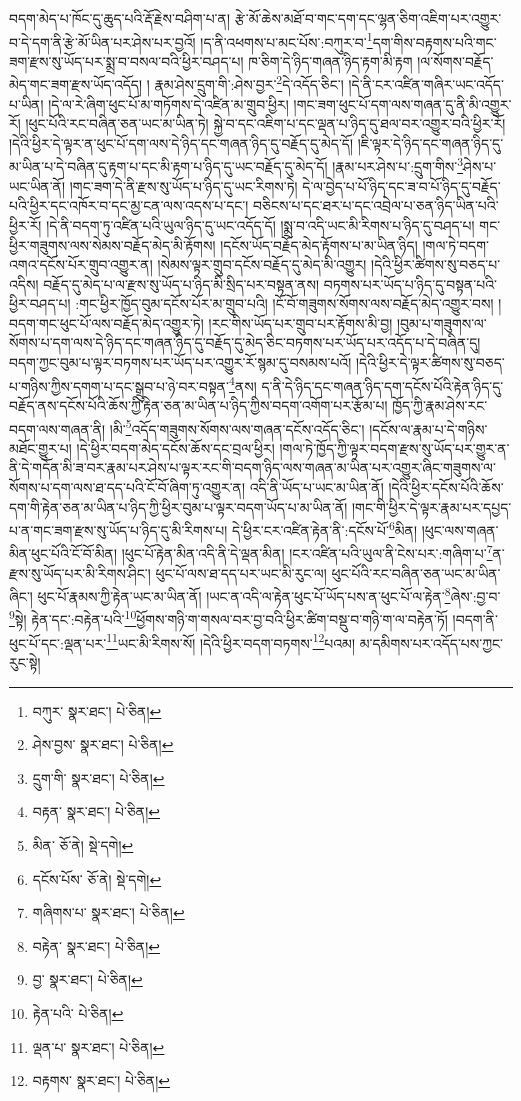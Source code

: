 བདག་མེད་པ་ཁོང་དུ་ཆུད་པའི་རྡོ་རྗེས་བཤིག་པ་ན། རྩེ་མོ་ཆེས་མཐོ་བ་གང་དག་དང་ལྷན་ཅིག་འཇིག་པར་འགྱུར་བ་དེ་དག་ནི་རྩེ་མོ་ཡིན་པར་ཤེས་པར་བྱའོ། །ད་ནི་འཕགས་པ་མང་པོས་:བཀུར་བ་\footnote{བཀུར་  སྣར་ཐང་།  པེ་ཅིན། }དག་གིས་བརྟགས་པའི་གང་ཟག་རྫས་སུ་ཡོད་པར་སྨྲ་བ་བསལ་བའི་ཕྱིར་བཤད་པ། ཁ་ཅིག་དེ་ཉིད་གཞན་ཉིད་རྟག་མི་རྟག །ལ་སོགས་བརྗོད་མེད་གང་ཟག་རྫས་ཡོད་འདོད། །
རྣམ་ཤེས་དྲུག་གི་:ཤེས་བྱར་\footnote{ཤེས་བྱས་  སྣར་ཐང་།  པེ་ཅིན། }དེ་འདོད་ཅིང་། །དེ་ནི་ངར་འཛིན་གཞིར་ཡང་འདོད་པ་ཡིན། །དེ་ལ་རེ་ཞིག་ཕུང་པོ་མ་གཏོགས་དེ་འཛིན་མ་གྲུབ་ཕྱིར། །གང་ཟག་ཕུང་པོ་དག་ལས་གཞན་དུ་ནི་མི་འགྱུར་རོ། །ཕུང་པོའི་རང་བཞིན་ཅན་ཡང་མ་ཡིན་ཏེ། སྐྱེ་བ་དང་འཇིག་པ་དང་ལྡན་པ་ཉིད་དུ་ཐལ་བར་འགྱུར་བའི་ཕྱིར་རོ། །དེའི་ཕྱིར་དེ་ལྟར་ན་ཕུང་པོ་དག་ལས་དེ་ཉིད་དང་གཞན་ཉིད་དུ་བརྗོད་དུ་མེད་དོ། །ཇི་ལྟར་དེ་ཉིད་དང་གཞན་ཉིད་དུ་མ་ཡིན་པ་དེ་བཞིན་དུ་རྟག་པ་དང་མི་རྟག་པ་ཉིད་དུ་ཡང་བརྗོད་དུ་མེད་དོ། །རྣམ་པར་ཤེས་པ་:དྲུག་གིས་\footnote{དྲུག་གི་  སྣར་ཐང་།  པེ་ཅིན། }ཤེས་པ་ཡང་ཡིན་ནོ། །གང་ཟག་དེ་ནི་རྫས་སུ་ཡོད་པ་ཉིད་དུ་ཡང་རིགས་ཏེ། དེ་ལ་བྱེད་པ་པོ་ཉིད་དང་ཟ་བ་པོ་ཉིད་དུ་བརྗོད་པའི་ཕྱིར་དང་འཁོར་བ་དང་མྱ་ངན་ལས་འདས་པ་དང་། བཅིངས་པ་དང་ཐར་པ་དང་འབྲེལ་པ་ཅན་ཉིད་ཡིན་པའི་ཕྱིར་རོ། །དེ་ནི་བདག་ཏུ་འཛིན་པའི་ཡུལ་ཉིད་དུ་ཡང་འདོད་དོ། །སྨྲ་བ་འདི་ཡང་མི་རིགས་པ་ཉིད་དུ་བཤད་པ། གང་ཕྱིར་གཟུགས་ལས་སེམས་བརྗོད་མེད་མི་རྟོགས། །དངོས་ཡོད་བརྗོད་མེད་རྟོགས་པ་མ་ཡིན་ཉིད། །གལ་ཏེ་བདག་འགའ་དངོས་པོར་གྲུབ་འགྱུར་ན། །སེམས་ལྟར་གྲུབ་དངོས་བརྗོད་དུ་མེད་མི་འགྱུར། །དེའི་ཕྱིར་ཚིགས་སུ་བཅད་པ་འདིས། བརྗོད་དུ་མེད་པ་ལ་རྫས་སུ་ཡོད་པ་ཉིད་མི་སྲིད་པར་བསྟན་ནས། བཏགས་པར་ཡོད་པ་ཉིད་དུ་བསྟན་པའི་ཕྱིར་བཤད་པ། :གང་ཕྱིར་ཁྱོད་བུམ་དངོས་པོར་མ་གྲུབ་པའི། །ངོ་བོ་གཟུགས་སོགས་ལས་བརྗོད་མེད་འགྱུར་བས། །བདག་གང་ཕུང་པོ་ལས་བརྗོད་མེད་འགྱུར་ཏེ། །རང་གིས་ཡོད་པར་གྲུབ་པར་རྟོགས་མི་བྱ། །བུམ་པ་གཟུགས་ལ་སོགས་པ་དག་ལས་དེ་ཉིད་དང་གཞན་ཉིད་དུ་བརྗོད་དུ་མེད་ཅིང་བཏགས་པར་ཡོད་པར་འདོད་པ་དེ་བཞིན་དུ། བདག་ཀྱང་བུམ་པ་ལྟར་བཏགས་པར་ཡོད་པར་འགྱུར་རོ་སྙམ་དུ་བསམས་པའོ། །དེའི་ཕྱིར་དེ་ལྟར་ཚིགས་སུ་བཅད་པ་གཉིས་ཀྱིས་དགག་པ་དང་སྒྲུབ་པ་ཉེ་བར་བསྟན་\footnote{བརྟན་  སྣར་ཐང་།  པེ་ཅིན། }ནས། ད་ནི་དེ་ཉིད་དང་གཞན་ཉིད་དག་དངོས་པོའི་རྟེན་ཉིད་དུ་བརྗོད་ནས་དངོས་པོའི་ཆོས་ཀྱི་རྟེན་ཅན་མ་ཡིན་པ་ཉིད་ཀྱིས་བདག་འགོག་པར་རྩོམ་པ། ཁྱོད་ཀྱི་རྣམ་ཤེས་རང་བདག་ལས་གཞན་ནི། །མི་\footnote{མིན་  ཅོ་ནེ།  སྡེ་དགེ། }འདོད་གཟུགས་སོགས་ལས་གཞན་དངོས་འདོད་ཅིང་། །དངོས་ལ་རྣམ་པ་དེ་གཉིས་མཐོང་གྱུར་པ། །དེ་ཕྱིར་བདག་མེད་དངོས་ཆོས་དང་བྲལ་ཕྱིར། །གལ་ཏེ་ཁྱོད་ཀྱི་ལྟར་བདག་རྫས་སུ་ཡོད་པར་གྱུར་ན་ནི་དེ་གདོན་མི་ཟ་བར་རྣམ་པར་ཤེས་པ་ལྟར་རང་གི་བདག་ཉིད་ལས་གཞན་མ་ཡིན་པར་འགྱུར་ཞིང་གཟུགས་ལ་སོགས་པ་དག་ལས་ཐ་དད་པའི་ངོ་བོ་ཞིག་ཏུ་འགྱུར་ན། འདི་ནི་ཡོད་པ་ཡང་མ་ཡིན་ནོ། །དེའི་ཕྱིར་དངོས་པོའི་ཆོས་དག་གི་རྟེན་ཅན་མ་ཡིན་པ་ཉིད་ཀྱི་ཕྱིར་བུམ་པ་ལྟར་བདག་ཡོད་པ་མ་ཡིན་ནོ། །གང་གི་ཕྱིར་དེ་ལྟར་རྣམ་པར་དཔྱད་པ་ན་གང་ཟག་རྫས་སུ་ཡོད་པ་ཉིད་དུ་མི་རིགས་པ། དེ་ཕྱིར་ངར་འཛིན་རྟེན་ནི་:དངོས་པོ་\footnote{དངོས་པོས་  ཅོ་ནེ།  སྡེ་དགེ། }མིན། །ཕུང་ལས་གཞན་མིན་ཕུང་པོའི་ངོ་བོ་མིན། །ཕུང་པོ་རྟེན་མིན་འདི་ནི་དེ་ལྡན་མིན། །ངར་འཛིན་པའི་ཡུལ་ནི་ངེས་པར་:གཞིག་པ་\footnote{གཞིགས་པ་  སྣར་ཐང་།  པེ་ཅིན། }ན་རྫས་སུ་ཡོད་པར་མི་རིགས་ཤིང་། ཕུང་པོ་ལས་ཐ་དད་པར་ཡང་མི་རུང་ལ། ཕུང་པོའི་རང་བཞིན་ཅན་ཡང་མ་ཡིན་ཞིང་། ཕུང་པོ་རྣམས་ཀྱི་རྟེན་ཡང་མ་ཡིན་ནོ། །ཡང་ན་འདི་ལ་རྟེན་ཕུང་པོ་ཡོད་པས་ན་ཕུང་པོ་ལ་རྟེན་\footnote{བརྟེན་  སྣར་ཐང་།  པེ་ཅིན། }ཞེས་:བྱ་བ་\footnote{བྱ་  སྣར་ཐང་།  པེ་ཅིན། }སྟེ། རྟེན་དང་:བརྟེན་པའི་\footnote{རྟེན་པའི་  པེ་ཅིན། }ཕྱོགས་གཉི་ག་གསལ་བར་བྱ་བའི་ཕྱིར་ཚིག་བསྡུ་བ་གཉི་ག་ལ་བརྟེན་ཏོ། །བདག་ནི་ཕུང་པོ་དང་:ལྡན་པར་\footnote{ལྡན་པ་  སྣར་ཐང་།  པེ་ཅིན། }ཡང་མི་རིགས་སོ། །དེའི་ཕྱིར་བདག་བཏགས་\footnote{བརྟགས་  སྣར་ཐང་།  པེ་ཅིན། }པའམ། མ་དམིགས་པར་འདོད་པས་ཀྱང་རུང་སྟེ། 